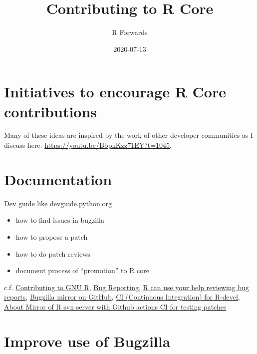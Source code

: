 \documentclass[]{book}
\title{Contributing to R Core}
\author{R Forwards}
\date{2020-07-13}
\providecommand{\tightlist}{%
  \setlength{\itemsep}{0pt}\setlength{\parskip}{0pt}}
\begin{document}
\maketitle

{
\setcounter{tocdepth}{1}
\tableofcontents
}
\hypertarget{initiatives-to-encourage-r-core-contributions}{%
\chapter{Initiatives to encourage R Core contributions}\label{initiatives-to-encourage-r-core-contributions}}

Many of these ideas are inspired by the work of other developer communities as I discuss here: \url{https://youtu.be/BbpkKzz71EY?t=1045}.

\hypertarget{documentation}{%
\chapter{Documentation}\label{documentation}}

Dev guide like devguide.python.org

\begin{itemize}
\tightlist
\item
  how to find issues in bugzilla
\item
  how to propose a patch
\item
  how to do patch reviews
\item
  document process of ``promotion'' to R core
\end{itemize}

c.f. \href{https://bookdown.org/lionel/contributing/}{Contributing to GNU R}, \href{https://www.r-project.org/bugs.html}{Bug Reporting}, \href{https://developer.r-project.org/Blog/public/2019/10/09/r-can-use-your-help-reviewing-bug-reports/index.html}{R can use your help reviewing bug reports}, \href{https://github.com/MichaelChirico/r-bugs}{Bugzilla mirror on GitHub}, \href{https://github.com/MichaelChirico/r-core-builder}{CI (Continuous Integration) for R-devel}, \href{https://github.com/jeroen/r-svn}{About
Mirror of R svn server with Github actions CI for testing patches}

\hypertarget{improve-use-of-bugzilla}{%
\chapter{Improve use of Bugzilla}\label{improve-use-of-bugzilla}}
\end{document}
